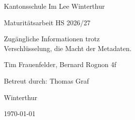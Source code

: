 \begin{titlepage}
		
	\centering
    
    \vspace{5cm}

	{\large{Kantonsschule Im Lee Winterthur}\par}
	\vspace{0.5cm}
	
	{\large Maturitätsarbeit HS 2026/27\par}
	
	\vspace{3cm}
	
	{\huge Zugängliche Informationen trotz\\[0.5cm] Verschlüsselung, die Macht der Metadaten.}
	
	\vspace{1.75cm}
	
	{\Large Tim Frauenfelder, Bernard Rognon 4f\par}
	
	\vspace{0.75cm}
	
	{\Large{Betreut durch: Thomas Graf}\par}
	
    \vspace{13.5cm}
    
	{\large Winterthur \par}
	\vspace{0.3cm}
	{\large \today}

\end{titlepage}
